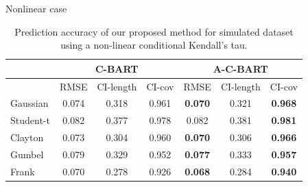 \documentclass[11pt]{beamer}
\begin{document}
    \begin{frame}{Nonlinear case}
        \begin{table}[ht]
        \tiny
	\centering
	\begin{tabular}{l|ccc|ccc}
		\multicolumn{1}{c|}{} &
		\multicolumn{3}{c|}{C-BART} &
		\multicolumn{3}{c}{A-C-BART} \\
		\midrule
		& RMSE & CI-length & CI-cov & RMSE & CI-length & CI-cov \\ 
		\midrule
		Gaussian & 0.074 & 0.318 & 0.961 & \textbf{0.070} & 0.321 & \textbf{0.968} \\ 
		Student-t & 0.082 & 0.377 & 0.978 & 0.082 & 0.381 & \textbf{0.981} \\ 
		Clayton & 0.073 & 0.304 & 0.960 & \textbf{0.070} & 0.306 & \textbf{0.966} \\ 
		Gumbel & 0.079 & 0.329 & 0.952 & \textbf{0.077} & 0.333 & \textbf{0.957} \\ 
		Frank & 0.070 & 0.278 & 0.926 & \textbf{0.068} & 0.284 & \textbf{0.940} \\  
	\end{tabular}
	\caption{Prediction accuracy of our proposed method for simulated dataset using a non-linear conditional Kendall's tau. }
	\label{tab:pred:ex2}
\end{table}

    \end{frame}
\end{document}

